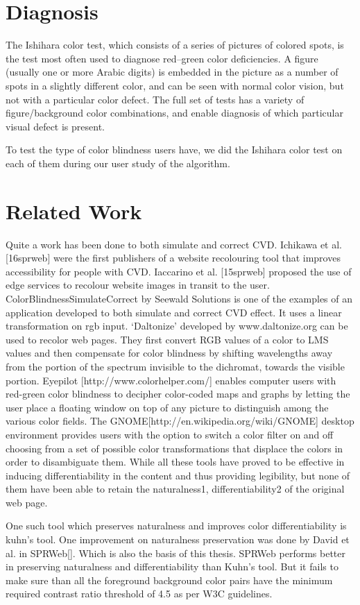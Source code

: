 \section{Diagnosis}
\label{Diagnosis}

The Ishihara color test, which consists of a series of pictures of colored spots, is the test most often used to diagnose red–green color deficiencies. A figure (usually one or more Arabic digits) is embedded in the picture as a number of spots in a slightly different color, and can be seen with normal color vision, but not with a particular color defect. The full set of tests has a variety of figure/background color combinations, and enable diagnosis of which particular visual defect is present.

To test the type of color blindness users have, we did the Ishihara color test on each of them during our user study of the algorithm.

\section{Related Work}
\label{Related Work}

Quite a work has been done to both simulate and correct CVD. Ichikawa et al. [16sprweb] were the first publishers of a website recolouring tool that improves accessibility for people with CVD. Iaccarino et al. [15sprweb] proposed the use of edge services to recolour website images in transit to the user. ColorBlindnessSimulateCorrect by Seewald Solutions is one of the examples of an application developed to both simulate and correct CVD effect. It uses a linear transformation on rgb input. ‘Daltonize’ developed by www.daltonize.org can be used to recolor web pages. They first convert RGB values of a color to LMS values and then compensate for color blindness by shifting wavelengths away from the portion of the spectrum invisible to the dichromat, towards the visible portion.  Eyepilot [http://www.colorhelper.com/] enables computer users with red-green color blindness to decipher color-coded maps and graphs by letting the user place a floating window on top of any picture to distinguish among the various color fields. The GNOME[http://en.wikipedia.org/wiki/GNOME] desktop environment provides users with the option to switch a color filter on and off choosing from a set of possible color transformations that displace the colors in order to disambiguate them. While all these tools have proved to be effective in inducing differentiability in the content and thus providing legibility, but none of them have been able to retain the naturalness1, differentiability2 of the original web page.

One such tool which preserves naturalness and improves color differentiability is kuhn’s tool. One improvement on naturalness preservation was done by David et al. in SPRWeb[]. Which is also the basis of this thesis. SPRWeb performs better in preserving naturalness and differentiability than Kuhn’s tool. But it fails to make sure than all the foreground background color pairs have the minimum required contrast ratio threshold of 4.5 as per W3C guidelines.

